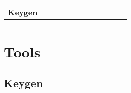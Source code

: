 \documentclass{report}
\begin{document}
\begin{table}[]
\begin{center}
\begin{tabular}{|c|c|c|c|c|c|c|c|c|c|c|c|}
Keygen                  &                                                                      &                             &                             &                             &                               &                                          &                                                &                             &                             &                                            &                                                                             \\ \hline
                        &                                                                      &                             &                             &                             &                               &                                          &                                                &                             &                             &                                            &                                                                             \\ \hline
\end{tabular}
\end{center}
\end{table}

\part{Tools}



\chapter{Keygen}
\end{document}
